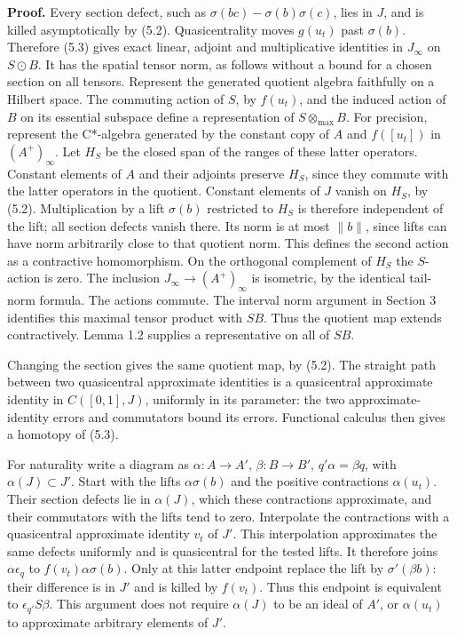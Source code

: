 \documentclass[
  11pt,
]{article}
\begin{document}
\textbf{Proof.} Every section defect, such as
\(\sigma(bc)-\sigma(b)\sigma(c)\), lies in \(J\), and is killed
asymptotically by (5.2). Quasicentrality moves \(g(u_t)\) past
\(\sigma(b)\). Therefore (5.3) gives exact linear, adjoint and
multiplicative identities in \(J_\infty\) on \(S\odot B\). It has the
spatial tensor norm, as follows without a bound for a chosen section on
all tensors. Represent the generated quotient algebra faithfully on a
Hilbert space. The commuting action of \(S\), by \(f(u_t)\), and the
induced action of \(B\) on its essential subspace define a
representation of \(S\otimes_{\max}B\). For precision, represent the
C*-algebra generated by the constant copy of \(A\) and \(f([u_t])\) in
\((A^+)_\infty\). Let \(H_S\) be the closed span of the ranges of these
latter operators. Constant elements of \(A\) and their adjoints preserve
\(H_S\), since they commute with the latter operators in the quotient.
Constant elements of \(J\) vanish on \(H_S\), by (5.2). Multiplication
by a lift \(\sigma(b)\) restricted to \(H_S\) is therefore independent
of the lift; all section defects vanish there. Its norm is at most
\(\|b\|\), since lifts can have norm arbitrarily close to that quotient
norm. This defines the second action as a contractive homomorphism. On
the orthogonal complement of \(H_S\) the \(S\)-action is zero. The
inclusion \(J_\infty\to(A^+)_\infty\) is isometric, by the identical
tail-norm formula. The actions commute. The interval norm argument in
Section 3 identifies this maximal tensor product with \(SB\). Thus the
quotient map extends contractively. Lemma 1.2 supplies a representative
on all of \(SB\).

Changing the section gives the same quotient map, by (5.2). The straight
path between two quasicentral approximate identities is a quasicentral
approximate identity in \(C([0,1],J)\), uniformly in its parameter: the
two approximate-identity errors and commutators bound its errors.
Functional calculus then gives a homotopy of (5.3).

For naturality write a diagram as \(\alpha:A\to A'\), \(\beta:B\to B'\),
\(q'\alpha=\beta q\), with \(\alpha(J)\subset J'\). Start with the lifts
\(\alpha\sigma(b)\) and the positive contractions \(\alpha(u_t)\). Their
section defects lie in \(\alpha(J)\), which these contractions
approximate, and their commutators with the lifts tend to zero.
Interpolate the contractions with a quasicentral approximate identity
\(v_t\) of \(J'\). This interpolation approximates the same defects
uniformly and is quasicentral for the tested lifts. It therefore joins
\(\alpha\epsilon_q\) to \(f(v_t)\alpha\sigma(b)\). Only at this latter
endpoint replace the lift by \(\sigma'(\beta b)\): their difference is
in \(J'\) and is killed by \(f(v_t)\). Thus this endpoint is equivalent
to \(\epsilon_{q'}S\beta\). This argument does not require \(\alpha(J)\)
to be an ideal of \(A'\), or \(\alpha(u_t)\) to approximate arbitrary
elements of \(J'\).
\end{document}
